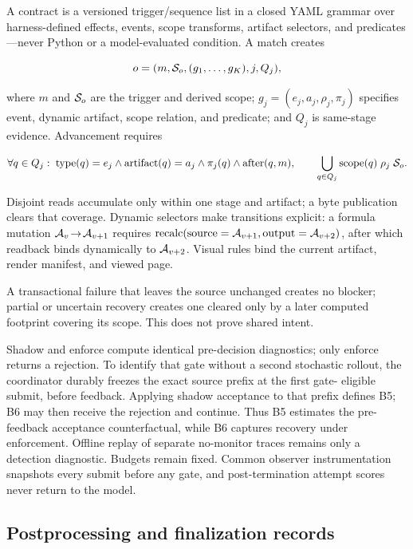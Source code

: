 A contract is a versioned trigger/sequence list in a closed YAML grammar over
harness-defined effects, events, scope transforms, artifact selectors, and
predicates---never Python or a model-evaluated condition. A match creates

\begin{equation}
  o=(m,\mathcal{S}_o,(g_1,\ldots,g_K),j,Q_j),
\end{equation}

where $m$ and $\mathcal{S}_o$ are the trigger and derived scope;
$g_j=(e_j,a_j,\rho_j,\pi_j)$ specifies event, dynamic artifact, scope relation,
and predicate; and $Q_j$ is same-stage evidence. Advancement requires

\begin{equation}
\label{eq:witness}
  \forall q\in Q_j:\;
  \operatorname{type}(q)=e_j \land
  \operatorname{artifact}(q)=a_j \land
  \pi_j(q) \land \operatorname{after}(q,m),
  \qquad
  \bigcup_{q\in Q_j}\operatorname{scope}(q)\;\rho_j\;\mathcal{S}_o.
\end{equation}

Disjoint reads accumulate only within one stage and artifact; a byte publication
clears that coverage. Dynamic selectors make transitions explicit: a formula mutation
$\mathcal{A}_v\!\rightarrow\!\mathcal{A}_{v+1}$ requires
$\operatorname{recalc}(\text{source}=\mathcal{A}_{v+1},
\text{output}=\mathcal{A}_{v+2})$, after which readback binds dynamically to
$\mathcal{A}_{v+2}$. Visual rules bind the current artifact, render manifest, and
viewed page.

A transactional failure that leaves the source unchanged creates no blocker;
partial or uncertain recovery creates one cleared only by a later computed
footprint covering its scope. This does not prove shared intent.

Shadow and enforce compute identical pre-decision diagnostics; only enforce
returns a rejection. To identify that gate without a second stochastic rollout,
the coordinator durably freezes the exact source prefix at the first gate-
eligible submit, before feedback. Applying shadow acceptance to that prefix
defines B5; B6 may then receive the rejection and continue. Thus B5 estimates
the pre-feedback acceptance counterfactual, while B6 captures recovery under
enforcement. Offline replay of separate no-monitor traces remains only a
detection diagnostic. Budgets remain fixed. Common observer instrumentation
snapshots every submit before any gate, and post-termination attempt scores
never return to the model.

\subsection{Postprocessing and finalization records}

